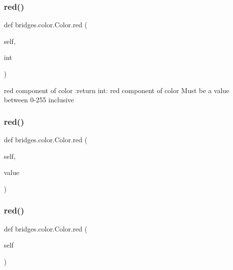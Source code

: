 \mbox{\label{classbridges_1_1color_1_1_color_ab2b29fe67b6ad8dddde7ff8eddedcce0}} 
\subsubsection{\texorpdfstring{red()}{red()}\hspace{0.1cm}{\footnotesize\ttfamily [1/3]}}
{\footnotesize\ttfamily def bridges.\+color.\+Color.\+red (\begin{DoxyParamCaption}\item[{}]{self,  }\item[{}]{int }\end{DoxyParamCaption})}

\begin{DoxyVerb}red component of color
:return int: red component of color
Must be a value between 0-255 inclusive
\end{DoxyVerb}
 \mbox{\label{classbridges_1_1color_1_1_color_a39719b281c9095293a1445c6deb7792b}} 
\subsubsection{\texorpdfstring{red()}{red()}\hspace{0.1cm}{\footnotesize\ttfamily [2/3]}}
{\footnotesize\ttfamily def bridges.\+color.\+Color.\+red (\begin{DoxyParamCaption}\item[{}]{self,  }\item[{}]{value }\end{DoxyParamCaption})}

\mbox{\label{classbridges_1_1color_1_1_color_ab2b29fe67b6ad8dddde7ff8eddedcce0}} 
\subsubsection{\texorpdfstring{red()}{red()}\hspace{0.1cm}{\footnotesize\ttfamily [3/3]}}
{\footnotesize\ttfamily def bridges.\+color.\+Color.\+red (\begin{DoxyParamCaption}\item[{}]{self }\end{DoxyParamCaption})}

